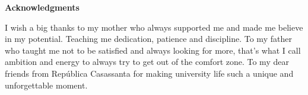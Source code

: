 
\begin{center}
\huge{{\bf Acknowledgments}}
\vspace{4cm}
\end{center}

I wish a big thanks to my mother who always supported me and made me believe in my potential. Teaching me dedication, patience and discipline.
To my father who taught me not to be satisfied and always looking for more, that's what I call ambition and energy to always try to get out of the comfort zone.
To my dear friends from República Casassanta for making university life such a unique and unforgettable moment.

\clearpage
\thispagestyle{empty}
\cleardoublepage
